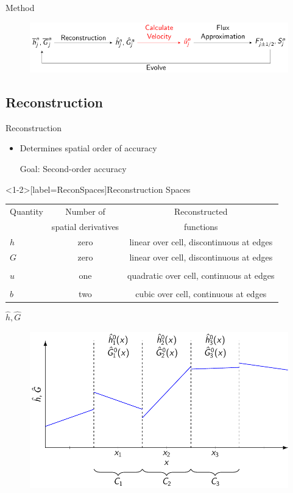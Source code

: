 \documentclass[pdf]{beamer}
\begin{document}
\begin{frame}{Method}
	\begin{figure}
		\includegraphics[width=1\textwidth]{./Pics/Tex/FlowCharts/FEVM.pdf}
	\end{figure}
\end{frame}
\subsection{Reconstruction}
\begin{frame}{Reconstruction}
	\begin{itemize}
		\item Determines spatial order of accuracy \\ \pause 
		\item[Goal:] Second-order accuracy %
	\end{itemize}
\end{frame}
\begin{frame}<1-2>[label=ReconSpaces]{Reconstruction Spaces}
	\begin{tabular}{l | c | c}
		Quantity& Number of &  Reconstructed \\
		 & spatial derivatives &  functions\\
		\hline \pause
		$h$ & zero & linear over cell, discontinuous at edges \\
		$G$ & zero & linear over cell, discontinuous at edges  \\ & & \\
		\pause 
		$u$ & one & quadratic over cell, continuous at edges\\ & & \\
		\pause
		$b$ & two & cubic over cell, continuous at edges \\ 
	\end{tabular}
\end{frame}
\begin{frame}{$\hat{h},\hat{G}$}
	\begin{figure}
		\includegraphics[width=\textwidth]{./Pics/Tex/Reconstructions/P1.pdf}
	\end{figure}
\end{frame}
\end{document}
